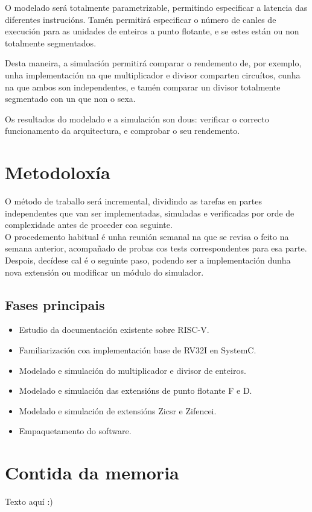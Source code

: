 O modelado será totalmente parametrizable, permitindo especificar a latencia das diferentes instrucións. Tamén permitirá especificar o número de canles de execución para as unidades de enteiros a punto flotante, e se estes están ou non totalmente segmentados. 

Desta maneira, a simulación permitirá comparar o rendemento de, por exemplo, unha implementación na que multiplicador e divisor comparten circuítos, cunha na que ambos son independentes, e tamén comparar un divisor totalmente segmentado con un que non o sexa. 

Os resultados do modelado e a simulación son dous: verificar o correcto funcionamento da arquitectura, e comprobar o seu rendemento. 


\section{Metodoloxía}
\label{sec:metodoloxía}
O método de traballo será incremental, dividindo as tarefas en partes independentes que van ser implementadas, simuladas e verificadas por orde de complexidade antes de proceder coa seguinte. \\
O procedemento habitual é unha reunión semanal na que se revisa o feito na semana anterior, acompañado de probas cos tests correspondentes para esa parte. Despois, decídese cal é o seguinte paso, podendo ser a implementación dunha nova extensión ou modificar un módulo do simulador.

\subsection{Fases principais}
\begin{itemize}
    \item Estudio da documentación existente sobre RISC-V.
    \item Familiarización coa implementación base de RV32I en SystemC. 
    \item Modelado e simulación do multiplicador e divisor de enteiros. 
    \item Modelado e simulación das extensións de punto flotante F e D. 
    \item Modelado e simulación de extensións Zicsr e  Zifencei.
    \item Empaquetamento do software. 

\end{itemize}

\section{Contida da memoria}
\label{sec:contido_memoria}
Texto aquí :)

